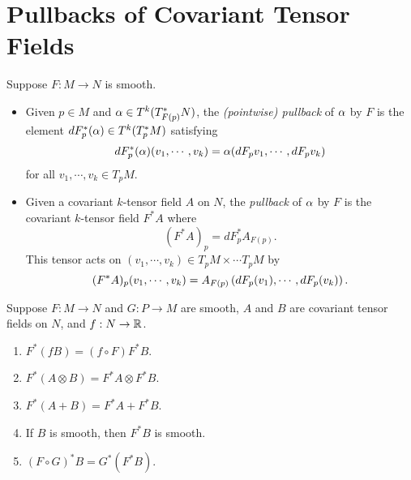 \section{Pullbacks of Covariant Tensor Fields}
\begin{definition}
    Suppose $F: M \to N$ is smooth.
    \begin{itemize}
    \item Given $p \in M$ and $\alpha \in T^k(T_{F(p)}^*N)$, the \textit{(pointwise) pullback} of $\alpha$ by $F$ is the element $dF_p^*(\alpha) \in T^k(T_p^*M)$ satisfying $$dF_p^*(\alpha)(v_1,\cdots,v_k) = \alpha(dF_p v_1, \cdots, dF_p v_k)$$ for all $v_1,\cdots,v_k \in T_pM$. 
    \item Given a covariant $k$-tensor field $A$ on $N$, the \textit{pullback} of $\alpha$ by $F$ is the covariant $k$-tensor field $F^*A$ where 
    $$ (F^*A)_p = dF_p^* A_{F(p)}. $$
    This tensor acts on $(v_1, \cdots, v_k) \in T_pM \times \cdots T_pM$ by 
    $$(F^*A)_p(v_1, \cdots, v_k) = A_{F(p)}\left(
    dF_p(v_1), \cdots, dF_p(v_k)\right). 
    $$
    \end{itemize}
\end{definition}
\begin{proposition}\label{12.25}
    Suppose $F:M \to N$ and $G:P \to M$ are smooth, $A$ and $B$ are covariant tensor fields on $N$, and $f:N \to \mathbb{R}$. 
    \begin{enumerate}
    \item $F^*(fB) = (f \circ F)F^*B$.
    \item $F^*(A \otimes B) = F^*A \otimes F^*B$.
    \item $F^*(A + B) = F^*A + F^*B$.
    \item If $B$ is smooth, then $F^*B$ is smooth. 
    \item $(F \circ G)^*B = G^* (F^*B)$. 
    \end{enumerate}
\end{proposition}
